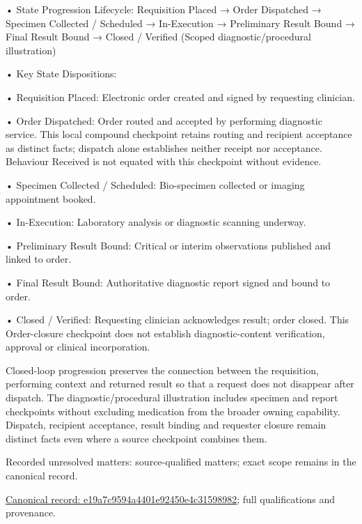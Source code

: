 •
State Progression Lifecycle: Requisition Placed → Order Dispatched → Specimen Collected / Scheduled → In-Execution → Preliminary Result Bound → Final Result Bound → Closed / Verified   (Scoped diagnostic/procedural illustration)



•
Key State Dispositions:



•
Requisition Placed: Electronic order created and signed by requesting clinician.



•
Order Dispatched: Order routed and accepted by performing diagnostic service. This local compound checkpoint retains routing and recipient acceptance as distinct facts; dispatch alone establishes neither receipt nor acceptance. Behaviour Received is not equated with this checkpoint without evidence.



•
Specimen Collected / Scheduled: Bio-specimen collected or imaging appointment booked.



•
In-Execution: Laboratory analysis or diagnostic scanning underway.



•
Preliminary Result Bound: Critical or interim observations published and linked to order.



•
Final Result Bound: Authoritative diagnostic report signed and bound to order.



•
Closed / Verified: Requesting clinician acknowledges result; order closed. This Order-closure checkpoint does not establish diagnostic-content verification, approval or clinical incorporation.



Closed-loop progression preserves the connection between the requisition, performing context and returned result so that a request does not disappear after dispatch. The diagnostic/procedural illustration includes specimen and report checkpoints without excluding medication from the broader owning capability. Dispatch, recipient acceptance, result binding and requester closure remain distinct facts even where a source checkpoint combines them.


{\small Recorded unresolved matters: source-qualified matters; exact scope remains in the canonical record.}\par
{\footnotesize \href{../../../../continuum/business/business-process/e19a7c9594a4401e92450e4c31598982.md}{Canonical record: e19a7c9594a4401e92450e4c31598982}; full qualifications and provenance.}\par
